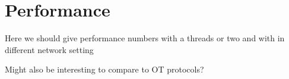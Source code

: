 \section{Performance}


Here we should give performance numbers with a threads or two and with in different network setting

Might also be interesting to compare to OT protocols?